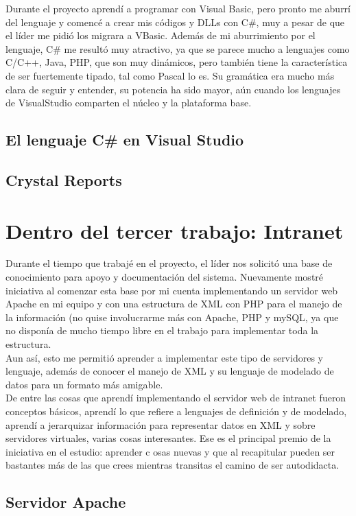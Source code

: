 \documentclass[12pt,spanish,lettersize]{book}
\begin{document}
Durante el proyecto aprendí a programar con Visual Basic, pero pronto me aburrí del lenguaje y comencé a crear mis códigos y DLLs con C\#, muy a pesar de que el líder me pidió los migrara a VBasic. Además de mi aburrimiento por el lenguaje, C\# me resultó muy atractivo, ya que se parece mucho a lenguajes como C/C++, Java, PHP, que son muy dinámicos, pero también tiene la característica de ser fuertemente tipado, tal como Pascal lo es. Su gramática era mucho más clara de seguir y entender, su potencia ha sido mayor, aún cuando los lenguajes de VisualStudio comparten el núcleo y la plataforma base. \\
\subsection{El lenguaje C\# en Visual Studio}
\subsection{Crystal Reports}
\section{Dentro del tercer trabajo: Intranet}
Durante el tiempo que trabajé en el proyecto, el líder nos solicitó una base de conocimiento para apoyo y documentación del sistema. Nuevamente mostré iniciativa al comenzar esta base por mi cuenta implementando un servidor web Apache en mi equipo y con una estructura de XML con PHP para el manejo de la información (no quise involucrarme más con Apache, PHP y mySQL, ya que no disponía de mucho tiempo libre en el trabajo para implementar toda la estructura.\\

Aun así, esto me permitió aprender a implementar este tipo de servidores y lenguaje, además de conocer el manejo de XML y su lenguaje de modelado de datos para un formato más amigable.\\

De entre las cosas que aprendí implementando el servidor web de intranet fueron conceptos básicos, aprendí lo que refiere a lenguajes de definición y de modelado, aprendí a jerarquizar información para representar datos en XML y sobre servidores virtuales, varias cosas interesantes. Ese es el principal premio de la iniciativa en el estudio: aprender c osas nuevas y que al recapitular pueden ser bastantes más de las que crees mientras transitas el camino de ser autodidacta.\\
\subsection{Servidor Apache}
\end{document}
